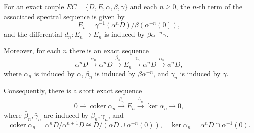 For an exact couple $\mathit{EC} = \{D, E, \alpha, \beta, \gamma\}$ and each $n \geq 0$, the $n$-th term of the associated spectral sequence is given by
$$E_n = \gamma^{-1}(\alpha^n D) / \beta(\alpha^{-n}(0)),$$
and the differential $d_n : E_n \to E_n$ is induced by $\beta\alpha^{-n}\gamma$.

Moreover, for each $n$ there is an exact sequence
$$\alpha^n D \xrightarrow{\alpha_n} \alpha^n D \xrightarrow{\beta_n} E_n \xrightarrow{\gamma_n} \alpha^n D \xrightarrow{\alpha_n} \alpha^n D,$$
where $\alpha_n$ is induced by $\alpha$, $\beta_n$ is induced by $\beta\alpha^{-n}$, and $\gamma_n$ is induced by $\gamma$.

Consequently, there is a short exact sequence
$$0 \to \operatorname{coker} \alpha_n \xrightarrow{\bar{\beta}_n} E_n \xrightarrow{\bar{\gamma}_n} \ker \alpha_n \to 0,$$
where $\bar{\beta}_n, \bar{\gamma}_n$ are induced by $\beta_n, \gamma_n$, and
$$\operatorname{coker} \alpha_n = \alpha^n D / \alpha^{n+1} D \cong D / (\alpha D \cup \alpha^{-n}(0)), \quad \ker \alpha_n = \alpha^n D \cap \alpha^{-1}(0).$$
